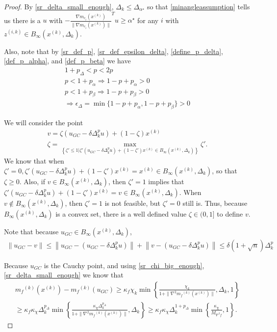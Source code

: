 \documentclass{article}
\theoremstyle{case}
\newcommand{\xk}{{x^{(k)}}}
\newcommand{\dk}{\Delta_k}
\newcommand{\mfk}{{{m}_f}^{(k)}}
\newcommand{\zik}{{z^{(i, k)}}}
\newcommand{\gmcik}{{\nabla m_{c_i}(\xk)}}
\newcommand{\minangledelta}{{\Delta_{\alpha^{\star}}}}
\newcommand{\minanglealpha}{{ \alpha^{\star} }}
\newcommand{\tr}{{ B_{\infty}\left(\xk, \dk\right) }}
\newcommand{\hfb}{{M_{\nabla^2 f}}}
\begin{document}
\begin{proof}
By \cref{sr_delta_small_enough}, $\dk \le \minangledelta$ so that \cref{minangleassumption}
tells us there is a $u$ with $-\frac {\gmcik}{\|\gmcik\|} ^Tu \ge \minanglealpha$ for any $i$ with $\zik \in \tr$.

Also, note that by \cref{sr_def_p}, \cref{sr_def_epsilon_delta}, \cref{define_p_delta}, \cref{def_p_alpha}, and \cref{def_p_beta} we have
\begin{align}
1 + p_{\Delta} < p < 2p\label{sr_p_big} \\
p < 1 + p_{\alpha} \Longrightarrow 1 - p + p_{\alpha} > 0  \label{sr_p_small_alpha} \\
p < 1 + p_{\beta}\Longrightarrow 1 - p + p_{\beta} > 0 \label{sr_p_small_beta} \\
\Longrightarrow \epsilon_{\Delta} = \min\{1 - p + p_{\alpha}, 1 - p + p_{\beta} \} > 0 \label{sr_epsilon_delta_positive}
\end{align}

We will consider the point 
\begin{align}
v = \zeta \left(u_{GC} - \delta \dk^{p} u\right) + (1-\zeta)\xk \label{define_v} \\
\zeta = \max_{\left\{\zeta' \le 1 | \zeta' \left(u_{GC} - \delta \dk^{p} u\right) + (1-\zeta')\xk \in \tr\right\}} \zeta' \label{define_zeta}.
\end{align}
We know that when $\zeta' = 0,  \zeta' \left(u_{GC} - \delta \dk^{p} u\right) + (1-\zeta')\xk = \xk \in \tr$, so that $\zeta \ge 0$.
Also, if $v\in\tr$, then $\zeta' = 1$ implies that $\zeta' \left(u_{GC} - \delta \dk^{p} u\right) + (1-\zeta')\xk = v \in \tr$.
When $v\not\in\tr$, then $\zeta' = 1$ is not feasible, but $\zeta' = 0$ still is.
Thus, because $\tr$ is a convex set, there is a well defined value $\zeta \in (0, 1]$ to define $v$.

Note that because $u_{GC} \in \tr$, 
\begin{align}
\|u_{GC} - v\| \le \left\|u_{GC} - \left(u_{GC} - \delta \dk^{p} u\right)\right\| + \left\|v - \left(u_{GC} - \delta \dk^{p} u\right)\right\| 
\le \delta\left(1 + \sqrt{n}\right) \dk^{p} \label{sr_v_close_u}
\end{align}

Because $u_{GC}$ is the Cauchy point, and using \cref{sr_chi_big_enough}, \cref{sr_delta_small_enough} we know that
\begin{align*}
\mfk(\xk) - \mfk(u_{GC})
 \ge \kappa_f \chi_k \min\left\{ \frac{\chi_k}{1+\|\nabla^2 \mfk(\xk)\|}, \dk, 1 \right\} \\
 \ge \kappa_f \kappa_{\chi} \dk^{p_{\Delta}} \min\left\{ \frac{\kappa_{\chi} \dk^{p_{\Delta}}}{1+\|\nabla^2 \mfk(\xk)\|}, \dk \right\}
 \ge \kappa_f \kappa_{\chi} \dk^{1 + p_{\Delta}} \min\left\{ \frac{\kappa_{\chi}}{\hfb}, 1 \right\}.
\end{align*}



\end{proof}
\end{document}
